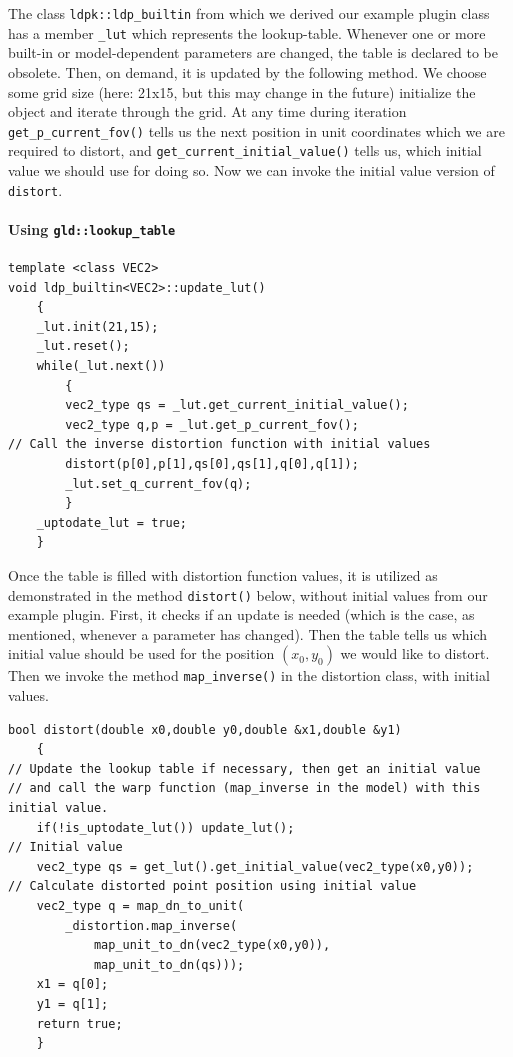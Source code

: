 \documentclass[10pt,a4paper]{article}
\begin{document}
The class {\tt ldpk::ldp\_builtin} from which we derived our example plugin class
has a member {\tt\_lut} which
represents the lookup-table. Whenever one or more built-in or
model-dependent parameters are changed, the table is declared to be obsolete.
Then, on demand, it is updated by the following method.
We choose some grid size (here: 21x15, but this may change in the future)
initialize the object and iterate through the grid.
At any time during iteration {\tt get\_p\_current\_fov()} tells us the
next position in unit coordinates which we are required to distort,
and {\tt get\_current\_initial\_value()} tells us, which initial value
we should use for doing so. Now we can invoke the initial value version of
{\tt distort}.
\paragraph{Using {\tt gld::lookup\_table}}
\begin{lstlisting}[language=mycpp,tabsize=8]
template <class VEC2>
void ldp_builtin<VEC2>::update_lut()
	{
	_lut.init(21,15);
	_lut.reset();
	while(_lut.next())
		{
		vec2_type qs = _lut.get_current_initial_value();
		vec2_type q,p = _lut.get_p_current_fov();
// Call the inverse distortion function with initial values
		distort(p[0],p[1],qs[0],qs[1],q[0],q[1]);
		_lut.set_q_current_fov(q);
		}
	_uptodate_lut = true;
	}
\end{lstlisting}
Once the table is filled with distortion function values, it is utilized as demonstrated
in the method {\tt distort()} below, without initial values from our example plugin.
First, it checks if an update is needed (which is the case, as mentioned, whenever
a parameter has changed). Then the table tells us which initial value should be used
for the position $(x_0,y_0)$ we would like to distort. Then we invoke the method
{\tt map\_inverse()} in the distortion class, with initial values.
\begin{lstlisting}[language=mycpp,tabsize=8]
bool distort(double x0,double y0,double &x1,double &y1)
	{
// Update the lookup table if necessary, then get an initial value
// and call the warp function (map_inverse in the model) with this initial value.
	if(!is_uptodate_lut()) update_lut();
// Initial value
	vec2_type qs = get_lut().get_initial_value(vec2_type(x0,y0));
// Calculate distorted point position using initial value
	vec2_type q = map_dn_to_unit(
		_distortion.map_inverse(
			map_unit_to_dn(vec2_type(x0,y0)),
			map_unit_to_dn(qs)));
	x1 = q[0];
	y1 = q[1];
	return true;
	}
\end{lstlisting}
\end{document}
